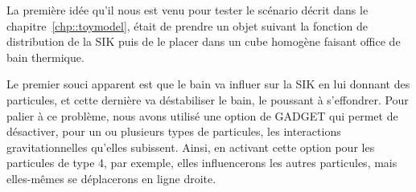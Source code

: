 La première idée qu'il nous est venu pour tester le scénario décrit dans le
chapitre~\ref{chp::toymodel}, était de prendre un objet suivant la fonction de
distribution de la SIK puis de le placer dans un cube homogène faisant office de
bain thermique.

Le premier souci apparent est que le bain va influer sur la SIK en lui donnant
des particules, et cette dernière va déstabiliser le bain, le poussant à
s'effondrer. Pour palier à ce problème, nous avons utilisé une option de
\textsc{GADGET} qui permet de désactiver, pour un ou plusieurs types de
particules, les interactions gravitationnelles qu'elles subissent.
Ainsi, en activant cette option pour les particules de type 4, par exemple,
elles influencerons les autres particules, mais elles-mêmes se déplacerons en
ligne droite.

